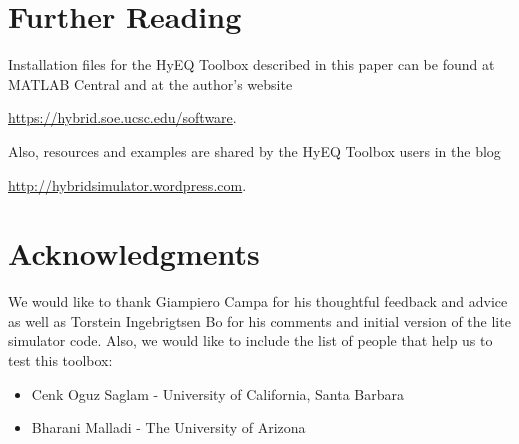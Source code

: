 \documentclass{article}
\begin{document}





\section{Further Reading}
\label{sec:closingremarks}
\noindent Installation files for the HyEQ Toolbox described in this paper can be found at MATLAB Central and at the author's website
\begin{center}
\url{https://hybrid.soe.ucsc.edu/software}.
\end{center}
Also, resources and examples are shared by the HyEQ Toolbox users in the blog
\begin{center}
\url{http://hybridsimulator.wordpress.com}.
\end{center}

\section{Acknowledgments}
\label{sec:acknowledgments}

We would like to thank Giampiero Campa for his thoughtful feedback and advice as well as Torstein Ingebrigtsen Bo for his comments and initial version of the lite simulator code.
%
Also, we would like to include the list of people that help us to test this toolbox:

\begin{itemize}
\item Cenk Oguz Saglam - University of California, Santa Barbara
\item Bharani Malladi - The University of Arizona
\end{itemize}



 
\label{sec:refs}

%

   
\end{document}
